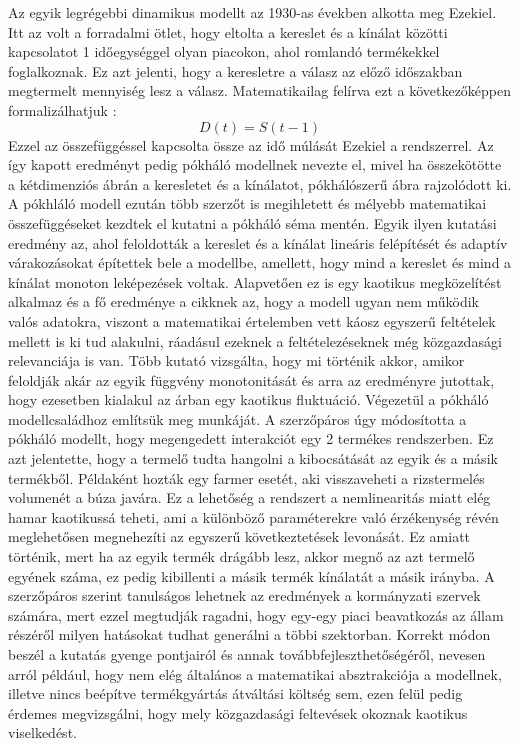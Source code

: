 \documentclass{article}
\theoremstyle{definition}
\theoremstyle{theorem}
\begin{document}
Az egyik legrégebbi dinamikus modellt \cite{Ezekiel} az 1930-as években alkotta meg Ezekiel. Itt az volt a forradalmi ötlet, hogy eltolta a kereslet és a kínálat közötti kapcsolatot 1 időegységgel olyan piacokon, ahol romlandó termékekkel foglalkoznak. Ez azt jelenti, hogy a keresletre a válasz az előző időszakban megtermelt mennyiség lesz a válasz. Matematikailag felírva ezt a következőképpen formalizálhatjuk :
\begin{equation*}
    D(t) = S(t-1)
\end{equation*}
Ezzel az összefüggéssel kapcsolta össze az idő múlását Ezekiel a rendszerrel. Az így kapott eredményt pedig pókháló modellnek nevezte el, mivel ha összekötötte a kétdimenziós ábrán a keresletet és a kínálatot, pókhálószerű ábra rajzolódott ki. A pókhláló modell ezután több szerzőt is megihletett és mélyebb matematikai összefüggéseket kezdtek el kutatni a pókháló séma mentén. Egyik ilyen kutatási eredmény \cite{HOMMES1994315} az, ahol feloldották a kereslet és a kínálat lineáris felépítését és adaptív várakozásokat építettek bele a modellbe, amellett, hogy mind a kereslet és mind a kínálat monoton leképezések voltak. Alapvetően ez is egy kaotikus megközelítést alkalmaz és a fő eredménye a cikknek az, hogy a modell ugyan nem működik valós adatokra, viszont a matematikai értelemben vett káosz egyszerű feltételek mellett is ki tud alakulni, ráadásul ezeknek a feltételezéseknek még közgazdasági relevanciája is van. Több kutató vizsgálta, hogy mi történik akkor, amikor feloldják akár az egyik függvény monotonitását \cite{Artstein1983} \cite{JENSEN1984235} \cite{LICHTENBERG1989225} és arra az eredményre jutottak, hogy ezesetben kialakul az árban egy kaotikus fluktuáció. Végezetül a pókháló modellcsaládhoz említsük meg \cite{DIECI20092011} munkáját. A szerzőpáros úgy módosította a pókháló modellt, hogy megengedett interakciót egy 2 termékes rendszerben. Ez azt jelentette, hogy a termelő tudta hangolni a kibocsátását az egyik és a másik termékből. Példaként hozták egy farmer esetét, aki visszaveheti a rizstermelés volumenét a búza javára. Ez a lehetőség a rendszert a nemlinearitás miatt elég hamar kaotikussá teheti, ami a különböző paraméterekre való érzékenység révén meglehetősen megnehezíti az egyszerű következtetések levonását. Ez amiatt történik, mert ha az egyik termék drágább lesz, akkor megnő az azt termelő egyének száma, ez pedig kibillenti a másik termék kínálatát a másik irányba. A szerzőpáros szerint tanulságos lehetnek az eredmények a kormányzati szervek számára, mert ezzel megtudják ragadni, hogy egy-egy piaci beavatkozás az állam részéről milyen hatásokat tudhat generálni a többi szektorban. Korrekt módon beszél a kutatás gyenge pontjairól és annak továbbfejleszthetőségéről, nevesen arról például, hogy nem elég általános a matematikai absztrakciója a modellnek, illetve nincs beépítve termékgyártás átváltási költség sem, ezen felül pedig érdemes megvizsgálni, hogy mely közgazdasági feltevések okoznak kaotikus viselkedést.
\end{document}
